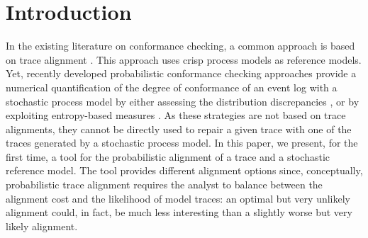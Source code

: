
\section{Introduction}
\label{introduction}
%
In the existing literature on conformance checking, a common approach is based on trace alignment \cite{DBLP:conf/edoc/AdriansyahDA11}. This approach uses crisp process models as reference models. Yet, recently developed probabilistic conformance checking approaches provide a numerical quantification of the degree of conformance
of an event log with a stochastic process model by either assessing the distribution discrepancies \cite{DBLP:conf/bpm/LeemansSA19}, or by exploiting entropy-based measures \cite{DBLP:conf/icpm/PolyvyanyyK19,DBLP:journals/tosem/PolyvyanyySWCM20}.
As these strategies are not based on trace alignments, they cannot be directly used to repair a given trace with one of the traces generated by a stochastic process model.
%
In this paper, we present, for the first time, a tool for the probabilistic alignment of a trace and a stochastic reference
model. %
The tool provides different alignment options since, conceptually, probabilistic trace alignment requires the analyst to
balance between the alignment cost and the likelihood of model traces: an optimal but very unlikely alignment could, in fact, be much less interesting than a slightly worse but very likely alignment.

